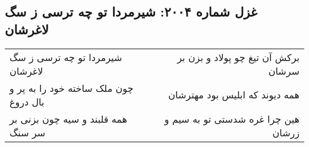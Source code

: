 \begin{center}
\section*{غزل شماره ۲۰۰۴: شیرمردا تو چه ترسی ز سگ لاغرشان}
\label{sec:2004}
\begin{longtable}{l p{0.5cm} r}
شیرمردا تو چه ترسی ز سگ لاغرشان
&&
برکش آن تیغ چو پولاد و بزن بر سرشان
\\
چون ملک ساخته خود را به پر و بال دروغ
&&
همه دیوند که ابلیس بود مهترشان
\\
همه قلبند و سیه چون بزنی بر سر سنگ
&&
هین چرا غره شدستی تو به سیم و زرشان
\\
\end{longtable}
\end{center}
